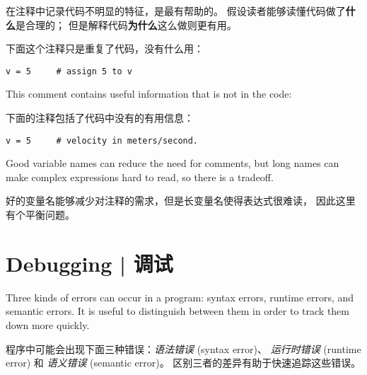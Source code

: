在注释中记录代码不明显的特征，是最有帮助的。 假设读者能够读懂代码做了\textbf{什么}是合理的； 但是解释代码\textbf{为什么}这么做则更有用。

下面这个注释只是重复了代码，没有什么用：

\begin{lstlisting}
v = 5     # assign 5 to v
\end{lstlisting}
%
This comment contains useful information that is not in the code:

下面的注释包括了代码中没有的有用信息：

\begin{lstlisting}
v = 5     # velocity in meters/second.
\end{lstlisting}
%
Good variable names can reduce the need for comments, but
long names can make complex expressions hard to read, so there is
a tradeoff.

好的变量名能够减少对注释的需求，但是长变量名使得表达式很难读， 因此这里有个平衡问题。

%
\section{Debugging  |  调试}
  
  

Three kinds of errors can occur in a program: syntax errors, runtime
errors, and semantic errors.  It is useful
to distinguish between them in order to track them down more quickly.

程序中可能会出现下面三种错误：\emph{语法错误} (syntax error)、 \emph{运行时错误} (runtime error) 和 \emph{语义错误} (semantic error)。 区别三者的差异有助于快速追踪这些错误。

